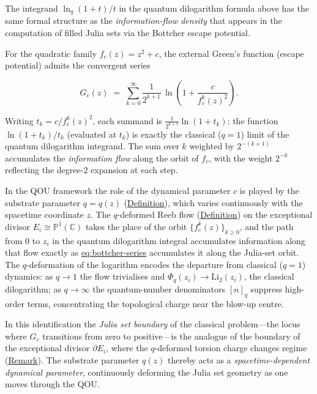 \begin{remark}
  \label{rem:qdlog-julia}
The integrand $\ln_q(1+t)/t$ in the quantum dilogarithm formula above has the same formal
structure as the \emph{information-flow density} that appears in the computation of
filled Julia sets via the Bottcher escape potential.

For the quadratic family $f_c(z)=z^2+c$, the external Green's function (escape potential)
admits the convergent series

\begin{equation}\label{eq:bottcher-series}
  G_c(z)
  \;=\;
  \sum_{k=0}^{\infty}
    \frac{1}{2^{k+1}}\,
    \ln\!\left(1+\frac{c}{f_c^k(z)^2}\right).
\end{equation}

Writing $t_k = c/f_c^k(z)^2$, each summand is $\frac{1}{2^{k+1}}\ln(1+t_k)$: the
function $\ln(1+t_k)/t_k$ (evaluated at $t_k$) is exactly the classical ($q=1$) limit
of the quantum dilogarithm integrand.  The sum over $k$ weighted by $2^{-(k+1)}$
accumulates the \emph{information flow} along the orbit of $f_c$, with the weight
$2^{-k}$ reflecting the degree-$2$ expansion at each step.

In the QOU framework the role of the dynamical parameter $c$ is played by the
substrate parameter $q=q(z)$ (\hyperref[def:substrate-parameter]{Definition}), which varies
continuously with the spacetime coordinate $z$.  The $q$-deformed Reeb flow
(\hyperref[def:q-reeb-flow]{Definition}) on the exceptional divisor $E_i \cong \mathbb{P}^1(\mathbb{C})$
takes the place of the orbit $\{f_c^k(z)\}_{k\geq 0}$, and the path from $0$ to $z_i$
in the quantum dilogarithm integral accumulates information along that flow exactly as
\hyperref[eq:bottcher-series]{eq:bottcher-series} accumulates it along the Julia-set orbit.  The
$q$-deformation of the logarithm encodes the departure from classical ($q=1$)
dynamics: as $q\to 1$ the flow trivialises and $\Phi_q(z_i)\to\mathrm{Li}_2(z_i)$,
the classical dilogarithm; as $q\to\infty$ the quantum-number denominators $[n]_q$
suppress high-order terms, concentrating the topological charge near the blow-up centre.

In this identification the \emph{Julia set boundary} of the classical problem---the
locus where $G_c$ transitions from zero to positive---is the analogue of the boundary
of the exceptional divisor $\partial E_i$, where the $q$-deformed torsion charge changes
regime (\hyperref[rem:reeb-exceptional-divisor]{Remark}).  The substrate parameter $q(z)$
thereby acts as a \emph{spacetime-dependent dynamical parameter}, continuously
deforming the Julia set geometry as one moves through the QOU.
\end{remark}

